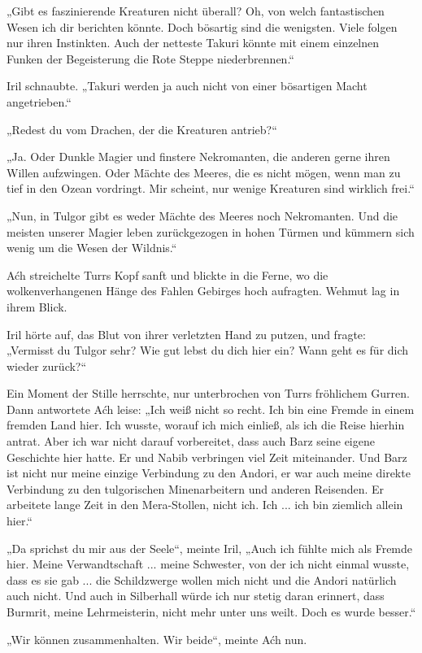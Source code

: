 „Gibt es faszinierende Kreaturen nicht überall? Oh, von welch fantastischen Wesen ich dir berichten könnte. Doch bösartig sind die wenigsten. Viele folgen nur ihren Instinkten. Auch der netteste Takuri könnte mit einem einzelnen Funken der Begeisterung die Rote Steppe niederbrennen.“

Iril schnaubte. „Takuri werden ja auch nicht von einer bösartigen Macht angetrieben.“

„Redest du vom Drachen, der die Kreaturen antrieb?“

„Ja. Oder Dunkle Magier und finstere Nekromanten, die anderen gerne ihren Willen aufzwingen. Oder Mächte des Meeres, die es nicht mögen, wenn man zu tief in den Ozean vordringt. Mir scheint, nur wenige Kreaturen sind wirklich frei.“

„Nun, in Tulgor gibt es weder Mächte des Meeres noch Nekromanten. Und die meisten unserer Magier leben zurückgezogen in hohen Türmen und kümmern sich wenig um die Wesen der Wildnis.“

Aćh streichelte Turrs Kopf sanft und blickte in die Ferne, wo die wolkenverhangenen Hänge des Fahlen Gebirges hoch aufragten. Wehmut lag in ihrem Blick.

Iril hörte auf, das Blut von ihrer verletzten Hand zu putzen, und fragte: „Vermisst du Tulgor sehr? Wie gut lebst du dich hier ein? Wann geht es für dich wieder zurück?“

Ein Moment der Stille herrschte, nur unterbrochen von Turrs fröhlichem Gurren. Dann antwortete Aćh leise: „Ich weiß nicht so recht. Ich bin eine Fremde in einem fremden Land hier. Ich wusste, worauf ich mich einließ, als ich die Reise hierhin antrat. Aber ich war nicht darauf vorbereitet, dass auch Barz seine eigene Geschichte hier hatte. Er und Nabib verbringen viel Zeit miteinander. Und Barz ist nicht nur meine einzige Verbindung zu den Andori, er war auch meine direkte Verbindung zu den tulgorischen Minenarbeitern und anderen Reisenden. Er arbeitete lange Zeit in den Mera-Stollen, nicht ich. Ich ... ich bin ziemlich allein hier.“

„Da sprichst du mir aus der Seele“, meinte Iril, „Auch ich fühlte mich als Fremde hier. Meine Verwandtschaft ... meine Schwester, von der ich nicht einmal wusste, dass es sie gab ... die Schildzwerge wollen mich nicht und die Andori natürlich auch nicht. Und auch in Silberhall würde ich nur stetig daran erinnert, dass Burmrit, meine Lehrmeisterin, nicht mehr unter uns weilt. Doch es wurde besser.“

„Wir können zusammenhalten. Wir beide“, meinte Aćh nun.

